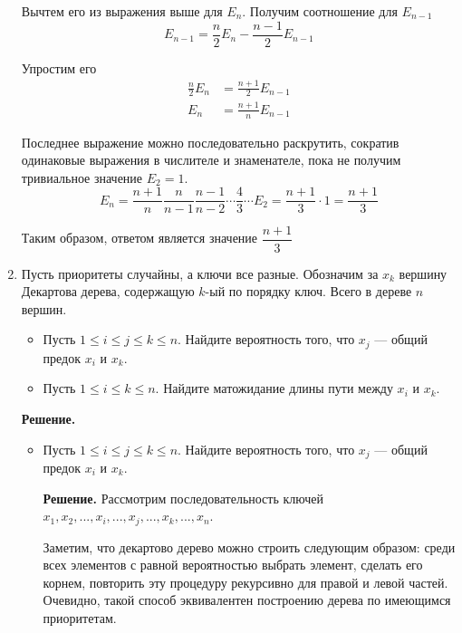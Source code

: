 \begin{enumerate}
	Вычтем его из выражения выше для $E_n$. Получим соотношение для $E_{n - 1}$
	\begin{equation*}
	E_{n - 1} = \frac{n}{2} E_{n} - \frac{n - 1}{2} E_{n - 1}
	\end{equation*}
	
	Упростим его
	\begin{align*}
	\frac{n}{2} E_n &= \frac{n + 1}{2}E_{n - 1} \\
	E_n &= \frac{n + 1}{n} E_{n - 1}
	\end{align*}
	
	Последнее выражение можно последовательно раскрутить, сократив одинаковые выражения в числителе и знаменателе, 
	пока не получим тривиальное значение $E_2 = 1$.
	\begin{equation*}
	E_n = \frac{n + 1}{n} \frac{n}{n - 1} \frac{n - 1}{n - 2} \cdots \frac{4}{3} \cdots E_2 = \frac{n + 1}{3} 
	\cdot 1 = \frac{n + 1}{3}
	\end{equation*}
	
	Таким образом, ответом является значение $\dfrac{n + 1}{3}$
	
	\item Пусть приоритеты случайны, а ключи все разные. Обозначим за $x_k$ вершину Декартова дерева,	
	содержащую $k$-ый по порядку ключ. Всего в дереве $n$ вершин.
	\begin{itemize}
		\item Пусть $1 \leqslant i \leqslant j \leqslant k \leqslant n$. Найдите вероятность того, что $x_j$ — 
		общий предок $x_i$ и $x_k$.
		\item Пусть $1 \leqslant i \leqslant k \leqslant n$. Найдите матожидание длины пути между $x_i$ и $x_k$.
	\end{itemize}
	
	\textbf{Решение.}
	
	\begin{itemize}
		\item Пусть $1 \leqslant i \leqslant j \leqslant k \leqslant n$. Найдите вероятность того, что $x_j$ — 
		общий предок $x_i$ и $x_k$.
		
		\textbf{Решение.} Рассмотрим последовательность ключей $x_1, x_2, ..., x_i, ..., x_j,..., x_k, ..., x_n$.
		
		Заметим, что декартово дерево можно строить следующим образом: среди всех элементов с равной вероятностью 
		выбрать элемент, сделать его корнем, повторить эту процедуру рекурсивно для правой и левой частей. 
		Очевидно, такой способ эквивалентен построению дерева по имеющимся приоритетам.
		

\end{itemize}
\end{enumerate}

